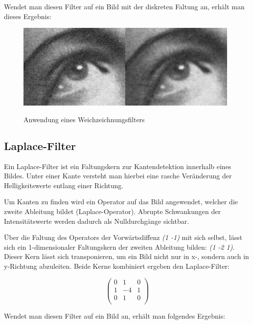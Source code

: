 Wendet man diesen Filter auf ein Bild mit der diskreten Faltung an, erhält man dieses Ergebnis:

\begin{figure}[ht]
   \centering
     \includegraphics[width=11cm]{Bilder/Gaussian_Blur} \\
 \caption{Anwendung eines Weichzeichnungsfilters}
 \label{fig:Blur}
\end{figure}

\subsection{Laplace-Filter}
Ein Laplace-Filter ist ein Faltungskern zur Kantendetektion innerhalb eines Bildes.
Unter einer Kante versteht man hierbei eine rasche Veränderung der Helligkeitswerte entlang einer Richtung.

Um Kanten zu finden wird ein Operator auf das Bild angewendet, welcher die zweite Ableitung bildet (Laplace-Operator). Abrupte Schwankungen der Intensitätswerte werden dadurch als Nulldurchgänge sichtbar.

Über die Faltung des Operators der Vorwärtsdiffenz {\em (1 -1)} mit sich selbst, lässt sich ein 1-dimensionaler Faltungskern der zweiten Ableitung bilden: {\em (1 -2 1)}.
Dieser Kern lässt sich transponieren, um ein Bild nicht nur in x-, sondern auch in y-Richtung abzuleiten.
Beide Kerne kombiniert ergeben den Laplace-Filter:

$$ \left( \begin{array}{rrr}
0 & 1 & 0 \\
1 & -4 & 1 \\
0 & 1 & 0 \\
\end{array}\right) $$

Wendet man diesen Filter auf ein Bild an, erhält man folgendes Ergebnis:


